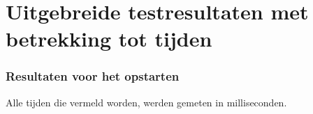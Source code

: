 \documentclass[pdftex,a4paper,12pt,twoside]{report}
\begin{document}
\tableofcontents

\appendix

\chapter{Uitgebreide testresultaten met betrekking tot tijden}
\label{ch:uitgebereidresultatenmetbetrekkingtottijden}

\subsection{Resultaten voor het opstarten}
Alle tijden die vermeld worden, werden gemeten in milliseconden.
\end{document}
